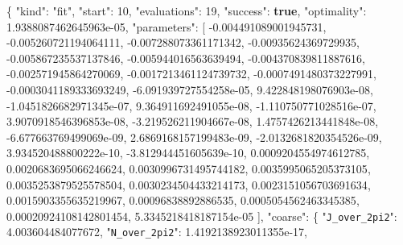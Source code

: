 \documentclass[
  10pt,
]{article}
\newenvironment{Shaded}{}{}
\newcommand{\DataTypeTok}[1]{\textcolor[rgb]{0.56,0.13,0.00}{#1}}
\newcommand{\DecValTok}[1]{\textcolor[rgb]{0.25,0.63,0.44}{#1}}
\newcommand{\FloatTok}[1]{\textcolor[rgb]{0.25,0.63,0.44}{#1}}
\newcommand{\FunctionTok}[1]{\textcolor[rgb]{0.02,0.16,0.49}{#1}}
\newcommand{\KeywordTok}[1]{\textcolor[rgb]{0.00,0.44,0.13}{\textbf{#1}}}
\newcommand{\OtherTok}[1]{\textcolor[rgb]{0.00,0.44,0.13}{#1}}
\newcommand{\StringTok}[1]{\textcolor[rgb]{0.25,0.44,0.63}{#1}}
\begin{document}
\begin{Shaded}
\begin{Highlighting}[]
\FunctionTok{\{}
  \DataTypeTok{"kind"}\FunctionTok{:} \StringTok{"fit"}\FunctionTok{,}
  \DataTypeTok{"start"}\FunctionTok{:} \DecValTok{10}\FunctionTok{,}
  \DataTypeTok{"evaluations"}\FunctionTok{:} \DecValTok{19}\FunctionTok{,}
  \DataTypeTok{"success"}\FunctionTok{:} \KeywordTok{true}\FunctionTok{,}
  \DataTypeTok{"optimality"}\FunctionTok{:} \FloatTok{1.9388087462645963e{-}05}\FunctionTok{,}
  \DataTypeTok{"parameters"}\FunctionTok{:} \OtherTok{[}
    \FloatTok{{-}0.004491089001945731}\OtherTok{,}
    \FloatTok{{-}0.005260721194064111}\OtherTok{,}
    \FloatTok{{-}0.007288073361171342}\OtherTok{,}
    \FloatTok{{-}0.00935624369729935}\OtherTok{,}
    \FloatTok{{-}0.005867235537137846}\OtherTok{,}
    \FloatTok{{-}0.005944016563639494}\OtherTok{,}
    \FloatTok{{-}0.004370839811887616}\OtherTok{,}
    \FloatTok{{-}0.002571945864270069}\OtherTok{,}
    \FloatTok{{-}0.0017213461124739732}\OtherTok{,}
    \FloatTok{{-}0.0007491480373227991}\OtherTok{,}
    \FloatTok{{-}0.0003041189333693249}\OtherTok{,}
    \FloatTok{{-}6.091939727554258e{-}05}\OtherTok{,}
    \FloatTok{9.422848198076903e{-}08}\OtherTok{,}
    \FloatTok{{-}1.0451826682971345e{-}07}\OtherTok{,}
    \FloatTok{9.364911692491055e{-}08}\OtherTok{,}
    \FloatTok{{-}1.110750771028516e{-}07}\OtherTok{,}
    \FloatTok{3.9070918546396853e{-}08}\OtherTok{,}
    \FloatTok{{-}3.219526211904667e{-}08}\OtherTok{,}
    \FloatTok{1.4757426213441848e{-}08}\OtherTok{,}
    \FloatTok{{-}6.677663769499069e{-}09}\OtherTok{,}
    \FloatTok{2.6869168157199483e{-}09}\OtherTok{,}
    \FloatTok{{-}2.0132681820354526e{-}09}\OtherTok{,}
    \FloatTok{3.934520488800222e{-}10}\OtherTok{,}
    \FloatTok{{-}3.812944451605639e{-}10}\OtherTok{,}
    \FloatTok{0.0009204554974612785}\OtherTok{,}
    \FloatTok{0.0020683695066246624}\OtherTok{,}
    \FloatTok{0.0030996731495744182}\OtherTok{,}
    \FloatTok{0.0035995065205373105}\OtherTok{,}
    \FloatTok{0.0035253879525578504}\OtherTok{,}
    \FloatTok{0.0030234504433214173}\OtherTok{,}
    \FloatTok{0.0023151056703691634}\OtherTok{,}
    \FloatTok{0.0015903355635219967}\OtherTok{,}
    \FloatTok{0.00096838892886535}\OtherTok{,}
    \FloatTok{0.0005054562463345385}\OtherTok{,}
    \FloatTok{0.00020924108142801454}\OtherTok{,}
    \FloatTok{5.3345218418187154e{-}05}
  \OtherTok{]}\FunctionTok{,}
  \DataTypeTok{"coarse"}\FunctionTok{:} \FunctionTok{\{}
    \DataTypeTok{"\nolinkurl{J_over_2pi2}"}\FunctionTok{:} \FloatTok{4.003604484077672}\FunctionTok{,}
    \DataTypeTok{"\nolinkurl{N_over_2pi2}"}\FunctionTok{:} \FloatTok{1.4192138923011355e{-}17}\FunctionTok{,}

\end{Highlighting}
\end{Shaded}
\end{document}
